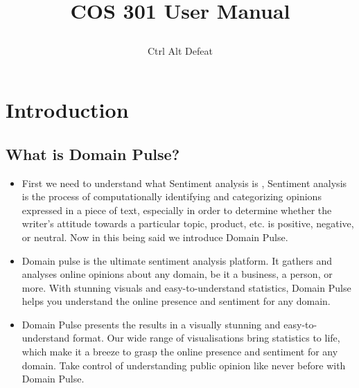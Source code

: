 \documentclass[12pt]{article}
\title{

\\
{COS 301 User Manual}
}
\author{Ctrl Alt Defeat}
\begin{document}


\tableofcontents

\newpage



\section{Introduction}
\subsection{What is Domain Pulse?}
\begin{itemize}
    \item First we need to understand what Sentiment analysis is , Sentiment analysis is the process of computationally identifying and categorizing opinions expressed in a piece of text, especially in order to determine whether the writer's attitude towards a particular topic, product, etc. is positive, negative, or neutral. Now in this being said we introduce Domain Pulse.
    \item Domain pulse is the ultimate sentiment analysis platform. It gathers and analyses online opinions about any domain, be it a business, a person, or more. With stunning visuals and easy-to-understand statistics, Domain Pulse helps you understand the online presence and sentiment for any domain.
    \item Domain Pulse presents the results in a visually stunning and easy-to-understand
    format. Our wide range of visualisations bring statistics to life, which make it a breeze
    to grasp the online presence and sentiment for any domain. Take control of
    understanding public opinion like never before with Domain Pulse.
\end{itemize}
\end{document}

